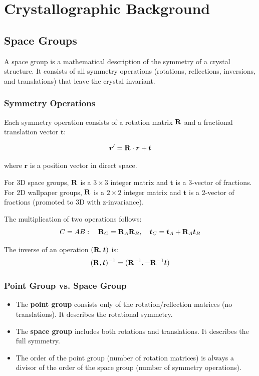 \chapter{Crystallographic Background}

\section{Space Groups}

A space group is a mathematical description of the symmetry of a crystal structure. It consists of all symmetry operations (rotations, reflections, inversions, and translations) that leave the crystal invariant.

\subsection{Symmetry Operations}

Each symmetry operation consists of a rotation matrix $\mathbf{R}$ and a fractional translation vector $\boldsymbol{t}$:

\begin{equation}
    \boldsymbol{r}' = \mathbf{R} \cdot \boldsymbol{r} + \boldsymbol{t}
\end{equation}

where $\boldsymbol{r}$ is a position vector in direct space.

For 3D space groups, $\mathbf{R}$ is a $3 \times 3$ integer matrix and $\boldsymbol{t}$ is a 3-vector of fractions. For 2D wallpaper groups, $\mathbf{R}$ is a $2 \times 2$ integer matrix and $\boldsymbol{t}$ is a 2-vector of fractions (promoted to 3D with z-invariance).

The multiplication of two operations follows:
\begin{equation}
    C = AB: \quad \mathbf{R}_C = \mathbf{R}_A \mathbf{R}_B, \quad \boldsymbol{t}_C = \boldsymbol{t}_A + \mathbf{R}_A \boldsymbol{t}_B
\end{equation}

The inverse of an operation $(\mathbf{R}, \boldsymbol{t})$ is:
\begin{equation}
    (\mathbf{R}, \boldsymbol{t})^{-1} = (\mathbf{R}^{-1}, -\mathbf{R}^{-1}\boldsymbol{t})
\end{equation}

\subsection{Point Group vs. Space Group}

\begin{itemize}
    \item The \textbf{point group} consists only of the rotation/reflection matrices (no translations). It describes the rotational symmetry.
    \item The \textbf{space group} includes both rotations and translations. It describes the full symmetry.
    \item The order of the point group (number of rotation matrices) is always a divisor of the order of the space group (number of symmetry operations).
\end{itemize}


